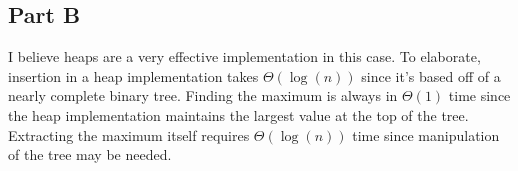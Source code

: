 \documentclass{article}
\begin{document}
\subsection*{Part B}
I believe heaps are a very effective implementation in this case. To elaborate, insertion in a heap implementation takes $\Theta(\log (n))$ since it's based off of a nearly complete binary tree. Finding the maximum is always in $\Theta(1)$ time since the heap implementation maintains the largest value at the top of the tree. Extracting the maximum itself requires $\Theta(\log(n))$ time since manipulation of the tree may be needed.  
\end{document}
